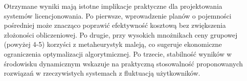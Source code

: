 Otrzymane wyniki mają istotne implikacje praktyczne dla projektowania systemów licencjonowania. Po pierwsze, wprowadzenie planów o pojemności pośredniej może znacząco poprawić efektywność kosztową bez zwiększenia złożoności obliczeniowej. Po drugie, przy wysokich mnożnikach ceny grupowej (powyżej 4-5) korzyści z metaheurystyk maleją, co sugeruje ekonomiczne ograniczenia optymalizacji algorytmicznej. Po trzecie, stabilność wyników w środowisku dynamicznym wskazuje na praktyczną stosowalność proponowanych rozwiązań w rzeczywistych systemach z fluktuacją użytkowników.
